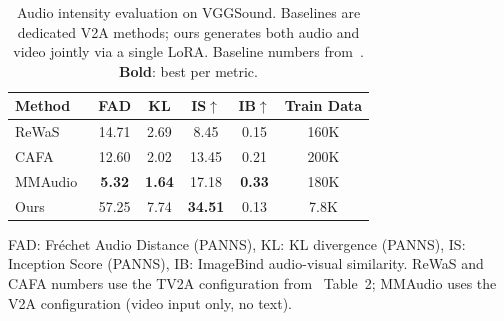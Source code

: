 \begin{table}[t]
\centering
\caption{Audio intensity evaluation on VGGSound. Baselines are dedicated V2A methods; ours generates both audio and video jointly via a single LoRA. Baseline numbers from~\protect\cite{benita2025cafa}. \textbf{Bold}: best per metric.}
\label{tab:audio_intensity}
\setlength{\tabcolsep}{3.5pt}
\begin{tabular}{lccccc}
\toprule
Method & FAD & KL & IS$\uparrow$ & IB$\uparrow$ & Train Data \\
\midrule
ReWaS~\cite{jeong2024rewas}      & 14.71 & 2.69 & 8.45  & 0.15 & 160K \\
CAFA~\cite{benita2025cafa}       & 12.60 & 2.02 & 13.45 & 0.21 & 200K \\
MMAudio~\cite{cheng2025mmaudio}  & \textbf{5.32}  & \textbf{1.64} & 17.18 & \textbf{0.33} & 180K \\
\midrule
Ours & 57.25 & 7.74 & \textbf{34.51} & 0.13 & 7.8K \\
\bottomrule
\end{tabular}
\vspace{1mm}

\small
FAD: Fr\'{e}chet Audio Distance (PANNS), KL: KL divergence (PANNS), IS: Inception Score (PANNS), IB: ImageBind audio-visual similarity. ReWaS and CAFA numbers use the TV2A configuration from~\cite{benita2025cafa} Table~2; MMAudio uses the V2A configuration (video input only, no text).
\end{table}
